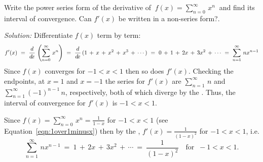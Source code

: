 \begin{exmp}\label{exmp:seriesderivxn}
\noindent Write the power series form of the derivative of
$~f(x) = \displaystyle\sum_{n=0}^{\infty} \,x^n~$ and find its interval of
convergence. Can $f'(x)$ be written in a non-series form?.\vspace{1mm}
\par\noindent\emph{Solution:} Differentiate $f(x)$ term by term:
\[
f'(x) ~=~ \frac{d}{d\!x}\,\left(\sum_{n=0}^{\infty} \,x^n\right) ~=~
\frac{d}{d\!x}\,(1 \,+\, x \,+\, x^2 \,+\, x^3 \,+\, \cdots) ~=~
0 \,+\, 1 \,+\, 2x \,+\, 3x^2 \,+\, \cdots ~=~
\sum_{n=1}^{\infty} \,n x^{n-1}
\]
Since $f(x)$ converges for $-1<x<1$ then so does $f'(x)$. Checking the
endpoints, at $x=1$ and $x=-1$ the series for $f'(x)$ are
$\sum_{n=1}^{\infty}\,n$ and $\sum_{n=1}^{\infty} (-1)^{n-1}\,n$, respectively,
both of which diverge by the . Thus, the interval of convergence
for $f'(x)$ is $-1<x<1$.\vspace{1mm}

\par\noindent Since $f(x)= \displaystyle\sum_{n=0}^{\infty} \,x^n = \frac{1}{1-x}$ for $-1<x<1$ (see Equation~\ref{eqn:1over1minusx}) then
by the , $f'(x)=\frac{1}{(1-x)^2}$ for $-1<x<1$, i.e.
\[
\sum_{n=1}^{\infty} \,n x^{n-1} ~=~ 1 \,+\, 2x \,+\, 3x^2 \,+\, \cdots ~=~
\frac{1}{(1-x)^2} \quad\text{for $~-1<x<1$.}
\]
\end{exmp}
\divider
\vspace{2mm}

\\


